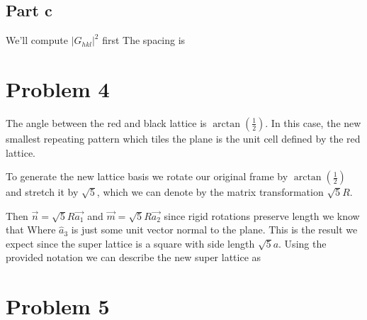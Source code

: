 \subsection*{Part c}
We'll compute $|G_{hkl}|^2$ first
The spacing is
\pagebreak
\section*{Problem 4}
The angle between the red and black lattice is $\arctan(\frac{1}{2})$. In this case, the new smallest repeating pattern which tiles the plane is the unit cell defined by the red lattice.

To generate the new lattice basis we rotate our original frame by $\arctan(\frac{1}{2})$ and stretch it by $\sqrt{5}$, which we can denote by the matrix transformation $\sqrt{5}R$.

Then $\Vec{n} = \sqrt{5}R\Vec{a_1}$ and $\Vec{m} = \sqrt{5}R\Vec{a_2}$ since rigid rotations preserve length we know that
Where $\hat{a}_3$ is just some unit vector normal to the plane. This is the result we expect since the super lattice is a square with side length $\sqrt{5}a$. Using the provided notation we can describe the new super lattice as
\pagebreak
\section*{Problem 5}
